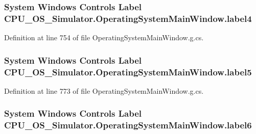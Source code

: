 \subsubsection[{label4}]{\setlength{\rightskip}{0pt plus 5cm}System Windows Controls Label C\+P\+U\+\_\+\+O\+S\+\_\+\+Simulator.\+Operating\+System\+Main\+Window.\+label4\hspace{0.3cm}{\ttfamily [package]}}\label{class_c_p_u___o_s___simulator_1_1_operating_system_main_window_a11f07634242ba2c38b23b293dcd3843e}


Definition at line 754 of file Operating\+System\+Main\+Window.\+g.\+cs.

\hypertarget{class_c_p_u___o_s___simulator_1_1_operating_system_main_window_a2b7721f6cfb0a1eeb4a0aec34ef543c0}{}
\subsubsection[{label5}]{\setlength{\rightskip}{0pt plus 5cm}System Windows Controls Label C\+P\+U\+\_\+\+O\+S\+\_\+\+Simulator.\+Operating\+System\+Main\+Window.\+label5\hspace{0.3cm}{\ttfamily [package]}}\label{class_c_p_u___o_s___simulator_1_1_operating_system_main_window_a2b7721f6cfb0a1eeb4a0aec34ef543c0}


Definition at line 773 of file Operating\+System\+Main\+Window.\+g.\+cs.

\hypertarget{class_c_p_u___o_s___simulator_1_1_operating_system_main_window_ad753667e4d67f79b83e59dc8be4df684}{}
\subsubsection[{label6}]{\setlength{\rightskip}{0pt plus 5cm}System Windows Controls Label C\+P\+U\+\_\+\+O\+S\+\_\+\+Simulator.\+Operating\+System\+Main\+Window.\+label6\hspace{0.3cm}{\ttfamily [package]}}\label{class_c_p_u___o_s___simulator_1_1_operating_system_main_window_ad753667e4d67f79b83e59dc8be4df684}


